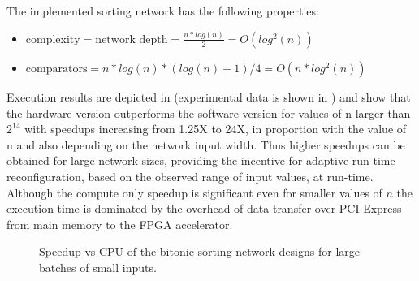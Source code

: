 The implemented sorting network has the following properties:
\begin{itemize}
\item $\text{complexity} = \text{network depth} = \frac{n * log(n)}{2} = O(log^2(n))  $
\item $\text{comparators} = n * log(n) * (log(n) + 1) / 4 = O(n * log^2(n)) $
\end{itemize}

Execution results are depicted in  (experimental
data is shown in ) and show that the
hardware version outperforms the software version for values of n
larger than $2^{14}$ with speedups increasing from 1.25X to 24X, in
proportion with the value of n and also depending on the network input
width. Thus higher speedups can be obtained for large network sizes,
providing the incentive for adaptive run-time reconfiguration, based
on the observed range of input values, at run-time. Although the
compute only speedup is significant even for smaller values of $n$ the
execution time is dominated by the overhead of data transfer over
PCI-Express from main memory to the FPGA accelerator.

\begin{figure}[!ht]
  \centering
  \hspace{-1cm}
  \caption{Speedup vs CPU of the bitonic sorting network designs for
    large batches of small inputs.}
  \label{fig:bsort-scalab}
\end{figure}

